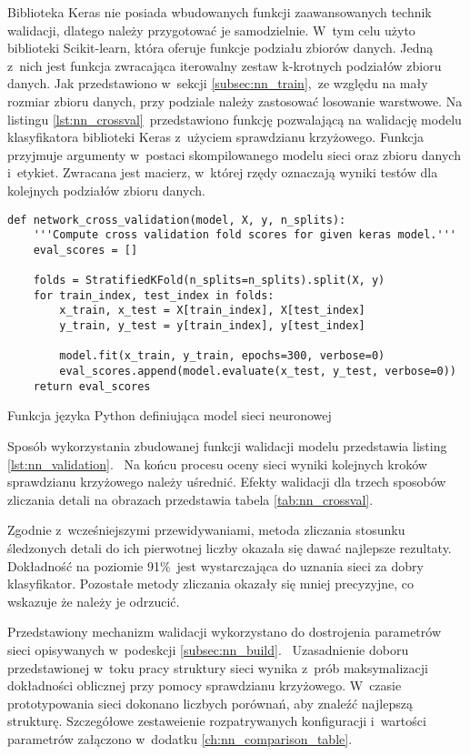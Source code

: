 Biblioteka Keras nie posiada wbudowanych funkcji zaawansowanych technik
walidacji, dlatego należy przygotować je samodzielnie.
W~tym celu użyto biblioteki Scikit-learn, która oferuje funkcje podziału zbiorów
danych.
Jedną z~nich jest funkcja zwracająca iterowalny zestaw k-krotnych podziałów
zbioru danych.
Jak przedstawiono w~sekcji \ref{subsec:nn_train},~ze względu na mały rozmiar
zbioru danych, przy podziale należy zastosować losowanie warstwowe.
Na listingu \ref{lst:nn_crossval}~przedstawiono funkcję pozwalającą na walidację
modelu klasyfikatora biblioteki Keras z~użyciem sprawdzianu krzyżowego.
Funkcja przyjmuje argumenty w~postaci skompilowanego modelu sieci oraz zbioru
danych i~etykiet.
Zwracana jest macierz, w~której rzędy oznaczają wyniki testów dla kolejnych
podziałów zbioru danych.
\begin{listing}[htb]
\begin{verbatim}
def network_cross_validation(model, X, y, n_splits):
    '''Compute cross validation fold scores for given keras model.'''
    eval_scores = []

    folds = StratifiedKFold(n_splits=n_splits).split(X, y)
    for train_index, test_index in folds:
        x_train, x_test = X[train_index], X[test_index]
        y_train, y_test = y[train_index], y[test_index]

        model.fit(x_train, y_train, epochs=300, verbose=0)
        eval_scores.append(model.evaluate(x_test, y_test, verbose=0))
    return eval_scores
\end{verbatim}
\caption{Funkcja języka Python definiująca model sieci neuronowej}
\label{lst:nn_crossval}
\end{listing}
Sposób wykorzystania zbudowanej funkcji walidacji modelu przedstawia listing
\ref{lst:nn_validation}.~%
Na końcu procesu oceny sieci wyniki kolejnych kroków sprawdzianu krzyżowego
należy uśrednić.
Efekty walidacji dla trzech sposobów zliczania detali na obrazach przedstawia
tabela \ref{tab:nn_crossval}.

Zgodnie z~wcześniejszymi przewidywaniami, metoda zliczania stosunku śledzonych
detali do ich pierwotnej liczby okazała się dawać najlepsze rezultaty.
Dokładność na poziomie 91\%~jest wystarczająca do uznania sieci za dobry
klasyfikator.
Pozostałe metody zliczania okazały się mniej precyzyjne, co wskazuje że należy
je odrzucić.

Przedstawiony mechanizm walidacji wykorzystano do dostrojenia parametrów sieci
opisywanych w~podeskcji \ref{subsec:nn_build}.~%
Uzasadnienie doboru przedstawionej w~toku pracy struktury sieci wynika z~prób
maksymalizacji dokładności oblicznej przy pomocy sprawdzianu krzyżowego.
W~czasie prototypowania sieci dokonano liczbych porównań, aby znaleźć najlepszą
strukturę.
Szczegółowe zestaweienie rozpatrywanych konfiguracji i~wartości parametrów
załączono w~dodatku \ref{ch:nn_comparison_table}.

